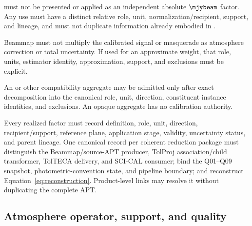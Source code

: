\begin{description}[style=nextline]
\item[\Req{017}: responsivity boundary.]
   must not be presented or applied as an independent
  absolute \(\mjybeam\) factor. Any use must have a distinct relative role,
  unit, normalization/recipient, support, and lineage, and must not duplicate
  information already embodied in .

\item[\Req{018}: sensitivity boundary.]
  Beammap  must not multiply the calibrated signal or masquerade as
  atmosphere correction or total uncertainty. If used for an approximate
  weight, that role, units, estimator identity, approximation, support, and
  exclusions must be explicit.

\item[\Req{019}: compatibility factor boundary.]
  An  or other compatibility aggregate may be admitted only after
  exact decomposition into the canonical role, unit, direction, constituent
  instance identities, and exclusions. An opaque aggregate has no calibration
  authority.

\item[\Req{020}: factor and package lineage.]
  Every realized factor must record definition, role, unit, direction,
  recipient/support, reference plane, application stage, validity,
  uncertainty status, and parent lineage. One canonical record per coherent
  reduction package must distinguish the Beammap/source-APT producer, TolProj
  association/child transformer, TolTECA delivery, and SCI-CAL consumer; bind
  the Q01--Q09 snapshot, photometric-convention state, and pipeline boundary;
  and reconstruct Equation~\eqref{eq:reconstruction}. Product-level links may
  resolve it without duplicating the complete APT.
\end{description}

\subsection{Atmosphere operator, support, and quality}

